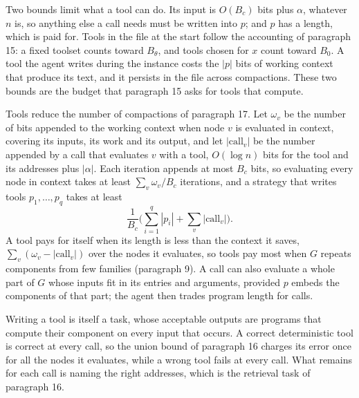 \documentclass[11pt]{article}
\begin{document}
Two bounds limit what a tool can do. Its input is $O(B_c)$ bits plus
$\alpha$, whatever $n$ is, so anything else a call needs must be written
into $p$; and $p$ has a length, which is paid for. Tools in the file at
the start follow the accounting of paragraph 15: a fixed toolset counts
toward $B_\theta$, and tools chosen for $x$ count toward $B_0$. A tool
the agent writes during the instance costs the $|p|$ bits of working
context that produce its text, and it persists in the file across
compactions. These two bounds are the budget that paragraph 15 asks for
tools that compute.

Tools reduce the number of compactions of paragraph 17. Let $\omega_v$
be the number of bits appended to the working context when node $v$ is
evaluated in context, covering its inputs, its work and its output, and
let $|\mathrm{call}_v|$ be the number appended by a call that evaluates
$v$ with a tool, $O(\log n)$ bits for the tool and its addresses plus
$|\alpha|$. Each iteration appends at most $B_c$ bits, so evaluating
every node in context takes at least $\sum_v\omega_v/B_c$ iterations,
and a strategy that writes tools $p_1,\ldots,p_q$ takes at least
\[
\frac{1}{B_c}\Big(\sum_{i=1}^{q}|p_i|+\sum_v|\mathrm{call}_v|\Big).
\]
A tool pays for itself when its length is less than the context it
saves, $\sum_v(\omega_v-|\mathrm{call}_v|)$ over the nodes it evaluates,
so tools pay most when $G$ repeats components from few families
(paragraph 9). A call can also evaluate a whole part of $G$ whose inputs
fit in its entries and arguments, provided $p$ embeds the components of
that part; the agent then trades program length for calls.

Writing a tool is itself a task, whose acceptable outputs are programs
that compute their component on every input that occurs. A correct
deterministic tool is correct at every call, so the union bound of
paragraph 16 charges its error once for all the nodes it evaluates,
while a wrong tool fails at every call. What remains for each call is
naming the right addresses, which is the retrieval task of
paragraph 16.
\end{document}
